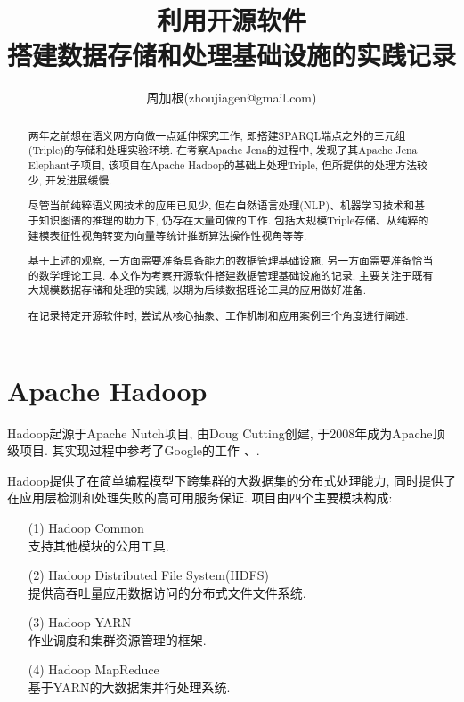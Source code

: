 \documentclass{article}
\title{利用开源软件\\搭建数据存储和处理基础设施的实践记录}
\author{周加根(zhoujiagen@gmail.com)}
\begin{document}
\setlength{\parskip}{0.5em}
\maketitle

\renewcommand\abstractname{简述}
\begin{abstract}
\setlength{\parskip}{0.5em}
两年之前想在语义网方向做一点延伸探究工作, 即搭建SPARQL端点之外的三元组(Triple)的存储和处理实验环境. 在考察Apache Jena的过程中, 发现了其Apache Jena Elephant子项目, 该项目在Apache Hadoop的基础上处理Triple, 但所提供的处理方法较少, 开发进展缓慢.

尽管当前纯粹语义网技术的应用已见少, 但在自然语言处理(NLP)、机器学习技术和基于知识图谱的推理的助力下, 仍存在大量可做的工作. 包括大规模Triple存储、从纯粹的建模表征性视角转变为向量等统计推断算法操作性视角等等.

基于上述的观察, 一方面需要准备具备能力的数据管理基础设施, 另一方面需要准备恰当的数学理论工具. 本文作为考察开源软件搭建数据管理基础设施的记录, 主要关注于既有大规模数据存储和处理的实践, 以期为后续数据理论工具的应用做好准备.

在记录特定开源软件时, 尝试从核心抽象、工作机制和应用案例三个角度进行阐述.

\end{abstract}

\newpage

\renewcommand\contentsname{目录}
\tableofcontents

\newpage

\section{Apache Hadoop}

Hadoop起源于Apache Nutch项目, 由Doug Cutting创建, 于2008年成为Apache顶级项目. 其实现过程中参考了Google的工作\cite{GFS} 、\cite{MapReduce}.

Hadoop提供了在简单编程模型下跨集群的大数据集的分布式处理能力, 同时提供了在应用层检测和处理失败的高可用服务保证. 项目由四个主要模块构成:

\begin{enumerate}
\item[(1)] Hadoop Common\\
支持其他模块的公用工具.
\item[(2)] Hadoop Distributed File System(HDFS)\\
提供高吞吐量应用数据访问的分布式文件文件系统.
\item[(3)] Hadoop YARN\\
作业调度和集群资源管理的框架.
\item[(4)] Hadoop MapReduce\\
基于YARN的大数据集并行处理系统.
\end{enumerate}
\end{document}
